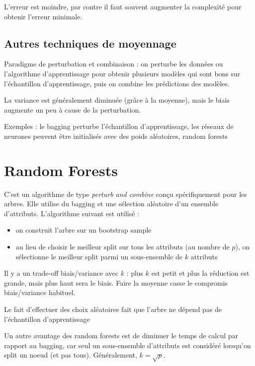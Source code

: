 	
	L'erreur est moindre, par contre il faut souvent augmenter la complexité pour obtenir l'erreur minimale.
	
	\subsection{Autres techniques de moyennage}
	
	Paradigme de perturbation et combinaison : on perturbe les données ou l'algorithme d'apprentissage pour obtenir plusieurs modèles qui sont bons sur l'échantillon d'apprentissage, puis on combine les prédictions des modèles.
	
	La variance est généralement diminuée (grâce à la moyenne), mais le biais augmente un peu à cause de la perturbation.
	
	Exemples : le bagging perturbe l'échantillon d'apprentissage, les réseaux de neurones peuvent être initialisés avec des poids aléatoires, random forests
	
\section{Random Forests}

	C'est un algorithme de type \textit{perturb and combine} conçu spécifiquement pour les arbres. Elle utilise du bagging et une sélection aléatoire d'un ensemble d'attributs. L'algorithme suivant est utilisé :
	
	\begin{itemize}
		\item on construit l'arbre sur un bootstrap sample
		\item au lieu de choisir le meilleur split sur tous les attributs (au nombre de $p$), on sélectionne le meilleur split parmi un sous-ensemble de $k$ attributs
	\end{itemize}
	
	Il y a un trade-off biais/variance avec $k$ : plus $k$ est petit et plus la réduction est grande, mais plus haut sera le biais. Faire la moyenne casse le compromis biais/variance habituel.
	
	Le fait d'effectuer des choix aléatoires fait que l'arbre ne dépend pas de l'échantillon d'apprentissage
	
	
	Un autre avantage des random forests est de diminuer le temps de calcul par rapport au bagging, car seul un sous-ensemble d'attributs est considéré lorsqu'on split un noeud (et pas tous). Généralement, $k = \sqrt{p}$.
	
